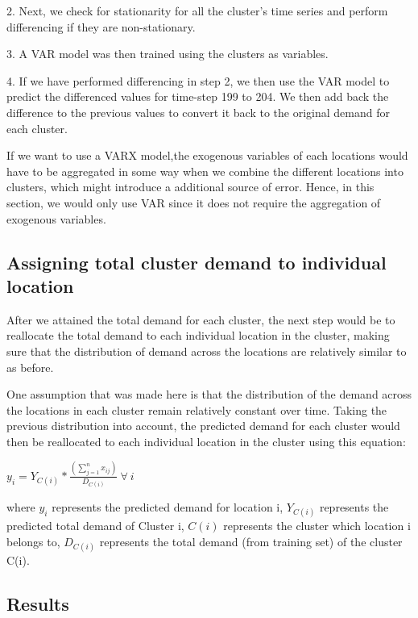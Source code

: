 \documentclass[12pt, letterpaper] {article}
\begin{document}
2. Next, we check for stationarity for all the cluster's time series and perform differencing if they are non-stationary. 

3. A VAR model was then trained using the clusters as variables.

4. If we have performed differencing in step 2, we then use the VAR model to predict the differenced values for time-step 199 to 204. We then add back the difference to the previous values to convert it back to the original demand for each cluster.

\noindent If we want to use a VARX model,the exogenous variables of each locations would have to be aggregated in some way when we combine the different locations into clusters, which might introduce a additional source of error. Hence, in this section, we would only use VAR since it does not require the aggregation of exogenous variables.


\subsection{Assigning total cluster demand to individual location}

After we attained the total demand for each cluster, the next step would be to reallocate the total demand to each individual location in the cluster, making sure that the distribution of demand across the locations are relatively similar to as before. 

\noindent One assumption that was made here is that the distribution of the demand across the locations in each cluster remain relatively constant over time. Taking the previous distribution into account, the predicted demand for each cluster would then be reallocated to each individual location in the cluster using this equation:

\begin{center}
    $\displaystyle y_{i} = Y_{C(i)} * \frac{(\sum_{j=1}^{n}x_{ij})}{D_{C(i)}} \: \forall \: i$
\end{center}

\noindent where $y_i$ represents the predicted demand for location i, $Y_{C(i)}$ represents the predicted total demand of Cluster i, $C(i)$ represents the cluster which location i belongs to, $D_{C(i)}$ represents the total demand (from training set) of the cluster C(i).


\subsection{Results}
\end{document}
